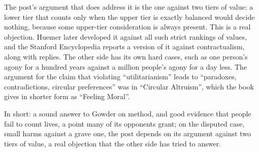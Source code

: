 \begin{afterword}
The post's argument that does address it is the one against two tiers of value: a lower tier that counts only when the upper tier is exactly balanced would decide nothing, because some upper-tier consideration is always present. This is a real objection. Huemer later developed it against all such strict rankings of values, and the Stanford Encyclopedia reports a version of it against contractualism, along with replies. The other side has its own hard cases, such as one person's agony for a hundred years against a million people's agony for a day less. The argument for the claim that violating ``utilitarianism'' leads to ``paradoxes, contradictions, circular preferences'' was in ``Circular Altruism'', which the book gives in shorter form as ``Feeling Moral''.

In short: a sound answer to Gowder on method, and good evidence that people fail to count lives, a point many of its opponents grant; on the disputed case, small harms against a grave one, the post depends on its argument against two tiers of value, a real objection that the other side has tried to answer.
\end{afterword}
